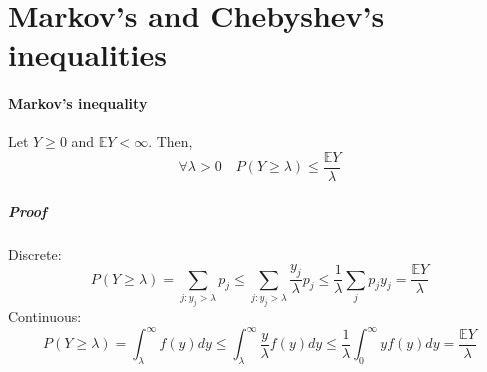 \section{Markov's and Chebyshev's inequalities}
\paragraph{Markov's inequality }
Let $Y\geq 0$ and $\mathbb{E} Y < \infty$. Then,
$$\forall \lambda > 0 \quad P(Y \geq \lambda) \leq \frac{\mathbb{E} Y}{\lambda}$$
\subparagraph{Proof}
Discrete:
$$P(Y \geq \lambda) = \sum_{j: y_j > \lambda} p_j \leq \sum_{j: y_j > \lambda} \frac{y_j}{\lambda} p_j  \leq \frac{1}{\lambda} \sum_j p_jy_j = \frac{\mathbb{E} Y}{\lambda}$$
Continuous:
$$P(Y \geq \lambda) = \int_\lambda^\infty f(y) dy \leq \int_\lambda^\infty \frac{y}{\lambda}f(y) dy   \leq \frac{1}{\lambda}\int_0^\infty yf(y)dy = \frac{\mathbb{E} Y}{\lambda}$$